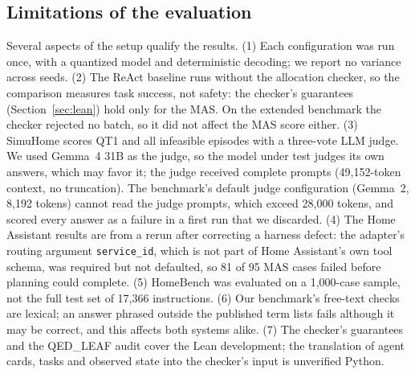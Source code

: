 \documentclass[a4paper,11pt]{article}
\begin{document}
\subsection{Limitations of the evaluation}

Several aspects of the setup qualify the results. (1) Each configuration was run once, with a
quantized model and deterministic decoding; we report no variance across seeds. (2) The ReAct
baseline runs without the allocation checker, so the comparison measures task success, not
safety: the checker's guarantees (Section~\ref{sec:lean}) hold only for the MAS. On the extended
benchmark the checker rejected no batch, so it did not affect the MAS score either. (3) SimuHome
scores QT1 and all infeasible episodes with a three-vote LLM judge. We used Gemma~4 31B as the
judge, so the model under test judges its own answers, which may favor it; the judge received
complete prompts (49,152-token context, no truncation). The benchmark's default judge
configuration (Gemma~2, 8,192 tokens) cannot read the judge prompts, which exceed 28,000 tokens,
and scored every answer as a failure in a first run that we discarded. (4) The Home Assistant
results are from a rerun after correcting a harness defect: the adapter's routing argument
\texttt{service\_id}, which is not part of Home Assistant's own tool schema, was required but not
defaulted, so 81 of 95 MAS cases failed before planning could complete. (5) HomeBench was
evaluated on a 1,000-case sample, not the full test set of 17,366 instructions. (6) Our
benchmark's free-text checks are lexical; an answer phrased outside the published term lists
fails although it may be correct, and this affects both systems alike. (7) The checker's
guarantees and the QED\_LEAF audit cover the Lean development; the translation of agent cards,
tasks and observed state into the checker's input is unverified Python.
\end{document}

